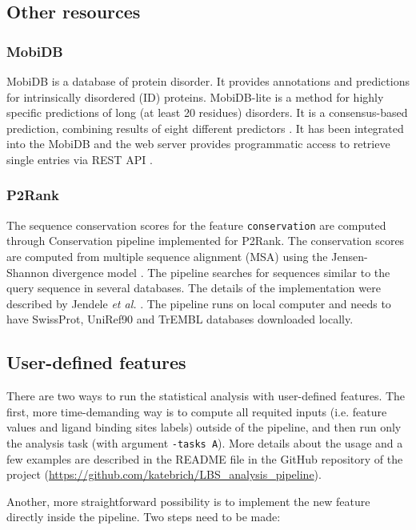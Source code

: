 \subsection{Other resources}

\subsubsection{MobiDB}

MobiDB is a database of protein disorder. It provides annotations and predictions for intrinsically disordered (ID) proteins. MobiDB-lite is a method for highly specific predictions of long (at least 20 residues) disorders. It is a consensus-based prediction, combining results of eight different predictors
\cite{mobidb}. It has been integrated into the MobiDB and the web server provides programmatic access to retrieve single entries via REST API \cite{mobidbApi}.

\subsubsection{P2Rank} \label{s:conservation}

The sequence conservation scores for the feature \texttt{conservation} are computed through Conservation pipeline \cite{conservation} implemented for P2Rank. The conservation scores are computed from multiple sequence alignment (MSA) using the Jensen-Shannon divergence model \cite{jensen}. The pipeline searches for sequences similar to the query sequence in several databases. The details of the implementation were described by Jendele \textit{et al.} \cite{prankweb}.
The pipeline runs on local computer and needs to have SwissProt, UniRef90 and TrEMBL databases downloaded locally.

\subsection{User-defined features}

There are two ways to run the statistical analysis with user-defined features. The first, more time-demanding way is to compute all requited inputs (i.e. feature values and ligand binding sites labels) outside of the pipeline, and then run only the analysis task (with argument \texttt{-tasks A}). More details about the usage and a few  examples are described in the README file in the GitHub repository of the project (\url{https://github.com/katebrich/LBS_analysis_pipeline}).

Another, more straightforward possibility is to implement the new feature directly inside the pipeline. Two steps need to be made:

